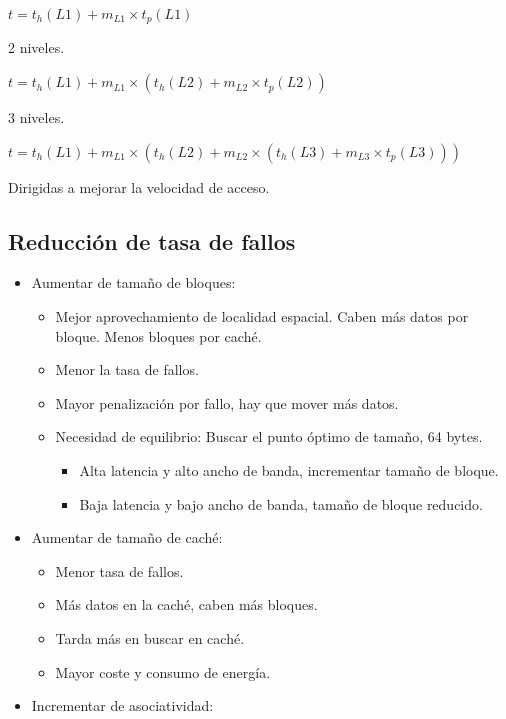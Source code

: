 \documentclass[12pt, twoside, openright]{report} %
\begin{document}
$t = t_h(L1) + m_{L1} \times t_p(L1)$

2 niveles.

$t = t_h(L1) + m_{L1} \times (t_h(L2) + m_{L2} \times t_p(L2))$

3 niveles.

$t = t_h(L1)+m_{L1}\times(t_h(L2) + m_{L2} \times (t_h(L3) + m_{L3} \times t_p(L3)))$

Dirigidas a mejorar la velocidad de acceso.

\subsection{Reducción de tasa de fallos}

\begin{itemize}

	\item Aumentar de tamaño de bloques:

	      \begin{itemize}

		      \item Mejor aprovechamiento de localidad espacial. Caben más datos por
		            bloque. Menos bloques por caché.
		      \item Menor la tasa de fallos.
		      \item Mayor penalización por fallo, hay que mover más datos.
		      \item Necesidad de equilibrio: Buscar el punto óptimo de tamaño, 64
		            bytes.

		            \begin{itemize}

			            \item Alta latencia y alto ancho de banda, incrementar tamaño de
			                  bloque.
			            \item Baja latencia y bajo ancho de banda, tamaño de bloque reducido.
		            \end{itemize}
	      \end{itemize}
	\item Aumentar de tamaño de caché:

	      \begin{itemize}

		      \item Menor tasa de fallos.
		      \item Más datos en la caché, caben más bloques.
		      \item Tarda más en buscar en caché.
		      \item Mayor coste y consumo de energía.
	      \end{itemize}
	\item Incrementar de asociatividad:


\end{itemize}
\end{document}
